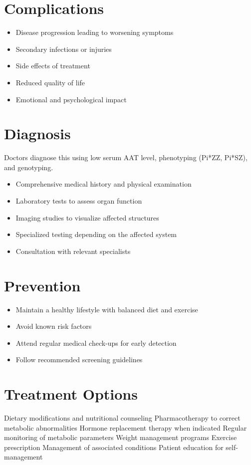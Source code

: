 \section{Complications}
\begin{itemize}[noitemsep]
  \item Disease progression leading to worsening symptoms
  \item Secondary infections or injuries
  \item Side effects of treatment
  \item Reduced quality of life
  \item Emotional and psychological impact
\end{itemize}
\section{Diagnosis}
Doctors diagnose this using low serum AAT level, phenotyping (Pi*ZZ, Pi*SZ), and genotyping.

\begin{itemize}[noitemsep]
  \item Comprehensive medical history and physical examination
  \item Laboratory tests to assess organ function
  \item Imaging studies to visualize affected structures
  \item Specialized testing depending on the affected system
  \item Consultation with relevant specialists
\end{itemize}
\section{Prevention}
\begin{itemize}[noitemsep]
  \item Maintain a healthy lifestyle with balanced diet and exercise
  \item Avoid known risk factors
  \item Attend regular medical check-ups for early detection
  \item Follow recommended screening guidelines
\end{itemize}
\section{Treatment Options}
Dietary modifications and nutritional counseling Pharmacotherapy to correct metabolic abnormalities Hormone replacement therapy when indicated Regular monitoring of metabolic parameters Weight management programs Exercise prescription Management of associated conditions Patient education for self-management

